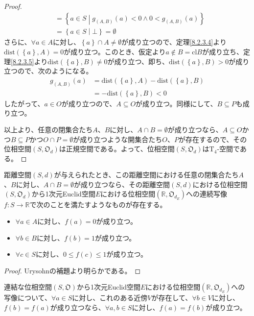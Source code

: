 \documentclass[dvipdfmx]{jsarticle}
\begin{document}
\begin{proof}
\begin{align*}
&= \left\{ a \in S \middle| g_{(A,B)}(a) < 0 \land 0 < g_{(A,B)}(a) \right\}\\
&= \left\{ a \in S \middle| \bot \right\} = \emptyset
\end{align*}
さらに、$\forall a \in A$に対し、$\left\{ a \right\} \cap A \neq \emptyset$が成り立つので、定理\ref{8.2.3.4}より$\mathrm{dist}\left( \left\{ a \right\},A \right) = 0$が成り立つ。このとき、仮定より$a \notin B = {\mathrm{cl}}B$が成り立ち、定理\ref{8.2.3.5}より$\mathrm{dist}\left( \left\{ a \right\},B \right) \neq 0$が成り立つ、即ち、$\mathrm{dist}\left( \left\{ a \right\},B \right) > 0$が成り立つので、次のようになる。
\begin{align*}
g_{(A,B)}(a) &= \mathrm{dist}\left( \left\{ a \right\},A \right) - \mathrm{dist}\left( \left\{ a \right\},B \right)\\
&= - \mathrm{dist}\left( \left\{ a \right\},B \right) < 0
\end{align*}
したがって、$a \in O$が成り立つので、$A \subseteq O$が成り立つ。同様にして、$B \subseteq P$も成り立つ。\par
以上より、任意の閉集合たち$A$、$B$に対し、$A \cap B = \emptyset$が成り立つなら、$A \subseteq O$かつ$B \subseteq P$かつ$O \cap P = \emptyset$が成り立つような開集合たち$O$、$P$が存在するので、その位相空間$\left( S,\mathfrak{O}_{d} \right)$は正規空間である。よって、位相空間$\left( S,\mathfrak{O}_{d} \right)$は$\mathrm{T}_{4}$-空間である。
\end{proof}
\begin{thm}\label{8.2.3.12s}
距離空間$(S,d)$が与えられたとき、この距離空間における任意の閉集合たち$A$、$B$に対し、$A \cap B = \emptyset$が成り立つなら、その距離空間$(S,d)$における位相空間$\left( S,\mathfrak{O}_{d} \right)$から1次元Euclid空間$E$における位相空間$\left( \mathbb{R},\mathfrak{O}_{d_{E}} \right)$への連続写像$f:S \rightarrow \mathbb{R}$で次のことを満たすようなものが存在する。
\begin{itemize}
\item
  $\forall a \in A$に対し、$f(a) = 0$が成り立つ。
\item
  $\forall b \in B$に対し、$f(b) = 1$が成り立つ。
\item
  $\forall c \in S$に対し、$0 \leq f(c) \leq 1$が成り立つ。
\end{itemize}
\end{thm}
\begin{proof} Urysohnの補題より明らかである。
\end{proof}
\begin{thm}\label{8.2.3.13}
連結な位相空間$\left( S,\mathfrak{O} \right)$から1次元Euclid空間$E$における位相空間$\left( \mathbb{R},\mathfrak{O}_{d_{E}} \right)$への写像について、$\forall a \in S$に対し、これのある近傍$V$が存在して、$\forall b \in V$に対し、$f(b) = f(a)$が成り立つなら、$\forall a,b \in S$に対し、$f(a) = f(b)$が成り立つ。
\end{thm}
\end{document}
